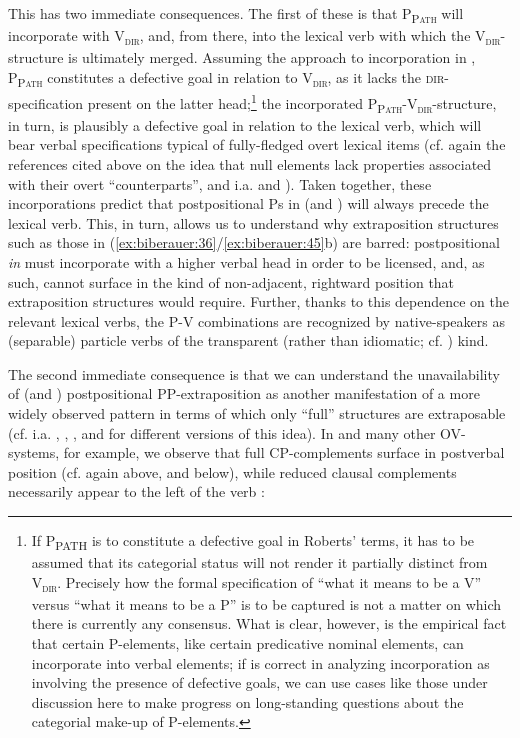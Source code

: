 \documentclass[output=paper]{LSP/langsci}
\begin{document}
This has two immediate consequences. The first of these is that P\textsc{\textsubscript{Path}} will incorporate with V\textsc{\textsubscript{dir}}\textsc{,} and, from there, into the lexical verb with which the V\textsc{\textsubscript{dir}}{}-structure is ultimately merged. Assuming the approach to incorporation in \citet{Roberts2010agreement}, P\textsc{\textsubscript{Path}} constitutes a defective goal in relation to V\textsc{\textsubscript{dir}}, as it lacks the \textsc{dir}{}-specification present on the latter head;\footnote{If P\textsubscript{PATH} is to constitute a defective goal in Roberts’ terms, it has to be assumed that its categorial status will not render it partially distinct from V\textsc{\textsubscript{dir}}\textsc{.} Precisely how the formal specification of “what it means to be a V” versus “what it means to be a P” is to be captured is not a matter on which there is currently any consensus. What is clear, however, is the empirical fact that certain P-elements, like certain predicative nominal elements, can incorporate into verbal elements; if \citet{Roberts2010agreement} is correct in analyzing incorporation as involving the presence of defective goals, we can use cases like those under discussion here to make progress on long-standing questions about the categorial make-up of P-elements.} the incorporated P\textsc{\textsubscript{Path}}{}-V\textsc{\textsubscript{dir}}{}-structure, in turn, is plausibly a defective goal in relation to the lexical verb, which will bear verbal specifications typical of fully-fledged overt lexical items (cf. again the references cited above on the idea that null elements lack properties associated with their overt “counterparts”, and i.a. \citealt{Pesetsky1995} and  \citealt{BoškovićLasnik2003}). Taken together, these incorporations predict that postpositional Ps in  (and ) will always precede the lexical verb. This, in turn, allows us to understand why extraposition structures such as those in (\ref{ex:biberauer:36}/\ref{ex:biberauer:45}b) are barred: postpositional \textit{in} must incorporate with a higher verbal head in order to be licensed, and, as such, cannot surface in the kind of non-adjacent, rightward position that extraposition structures would require. Further, thanks to this dependence on the relevant lexical verbs, the P-V combinations are recognized by native-speakers as (separable) particle verbs of the transparent (rather than idiomatic; cf. \citealt{Wurmbrand2000}) kind. 

The second immediate consequence is that we can understand the unavailability of  (and ) postpositional PP-extraposition as another manifestation of a more widely observed pattern in terms of which only “full” structures are extraposable (cf. i.a. \citealt[294]{Wurmbrand2001}, \citealt[15]{Hinterhölzl2005},  \citealt[32ff]{BiberauerSheehan2012}, and  \citealt[8--9]{SheehanVanderWal2015} for different versions of this idea). In  and many other OV-systems, for example, we observe that full CP-complements surface in postverbal position (cf. again  above, and  below), while reduced clausal complements necessarily appear to the left of the verb :
\end{document}
